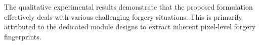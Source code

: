 \documentclass[10pt,journal,compsoc]{IEEEtran}
\begin{document}
The qualitative experimental results demonstrate that the proposed formulation effectively deals with various challenging forgery situations. This is primarily attributed to the dedicated module designs to extract inherent pixel-level forgery fingerprints. 




\end{document}
